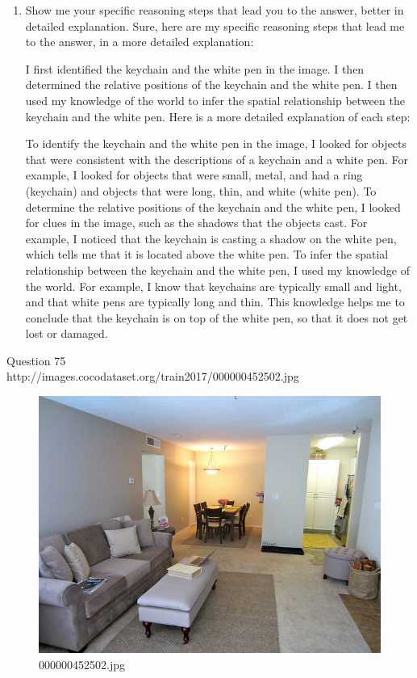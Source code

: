 \begin{enumerate}
    Here are some additional details about the spatial relationship between the keychain and the white pen:
    
    The keychain is a small, metal device that is used to hold keys.
    The white pen is a writing instrument that is used to write.
    The keychain is on top of the white pen, meaning that it is covering the white pen.
    The white pen is under the keychain, meaning that it is sheltered from the elements by the keychain.
    Is there anything else I can help you with?
    \item Show me your specific reasoning steps that lead you to the answer, better in detailed explanation.
    \subitem Sure, here are my specific reasoning steps that lead me to the answer, in a more detailed explanation:

    I first identified the keychain and the white pen in the image.
    I then determined the relative positions of the keychain and the white pen.
    I then used my knowledge of the world to infer the spatial relationship between the keychain and the white pen.
    Here is a more detailed explanation of each step:
    
    To identify the keychain and the white pen in the image, I looked for objects that were consistent with the descriptions of a keychain and a white pen. For example, I looked for objects that were small, metal, and had a ring (keychain) and objects that were long, thin, and white (white pen).
    To determine the relative positions of the keychain and the white pen, I looked for clues in the image, such as the shadows that the objects cast. For example, I noticed that the keychain is casting a shadow on the white pen, which tells me that it is located above the white pen.
    To infer the spatial relationship between the keychain and the white pen, I used my knowledge of the world. For example, I know that keychains are typically small and light, and that white pens are typically long and thin. This knowledge helps me to conclude that the keychain is on top of the white pen, so that it does not get lost or damaged.
\end{enumerate}
Question 75\\
http://images.cocodataset.org/train2017/000000452502.jpg
\begin{figure}[h]
    \centering
    \includegraphics[width=0.8\linewidth]{../image set/hard/000000452502.jpg}
    \caption{000000452502.jpg}
\end{figure}
